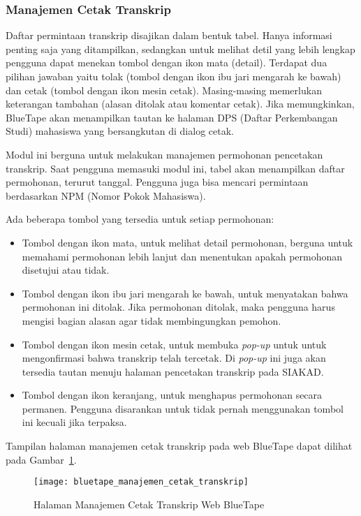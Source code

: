 \subsubsection{Manajemen Cetak Transkrip}
\label{sec:bluetape_manajemen_cetak_transkrip}
Daftar permintaan transkrip disajikan dalam bentuk tabel. Hanya informasi penting saja yang ditampilkan, sedangkan untuk melihat detil yang lebih lengkap pengguna dapat menekan tombol dengan ikon mata (detail). Terdapat dua pilihan jawaban yaitu tolak (tombol dengan ikon ibu jari mengarah ke bawah) dan cetak (tombol dengan ikon mesin cetak). Masing-masing memerlukan keterangan tambahan (alasan ditolak atau komentar cetak). Jika memungkinkan, BlueTape akan menampilkan tautan ke halaman DPS (Daftar Perkembangan Studi) mahasiswa yang bersangkutan di dialog cetak.

Modul ini berguna untuk melakukan manajemen permohonan pencetakan transkrip. Saat pengguna memasuki modul ini, tabel akan menampilkan daftar permohonan, terurut tanggal. Pengguna juga bisa mencari permintaan berdasarkan NPM (Nomor Pokok Mahasiswa).

Ada beberapa tombol yang tersedia untuk setiap permohonan:
\begin{itemize}
	\item Tombol dengan ikon mata, untuk melihat detail permohonan, berguna untuk memahami permohonan lebih lanjut dan menentukan apakah permohonan disetujui atau tidak.
	\item Tombol dengan ikon ibu jari mengarah ke bawah, untuk menyatakan bahwa permohonan ini ditolak. Jika permohonan ditolak, maka pengguna harus mengisi bagian alasan agar tidak membingungkan pemohon.
	\item Tombol dengan ikon mesin cetak, untuk membuka \textit{pop-up} untuk untuk mengonfirmasi bahwa transkrip telah tercetak. Di \textit{pop-up} ini juga akan tersedia tautan menuju halaman pencetakan transkrip pada SIAKAD.
	\item Tombol dengan ikon keranjang, untuk menghapus permohonan secara permanen. Pengguna disarankan untuk tidak pernah menggunakan tombol ini kecuali jika terpaksa.
\end{itemize} 

Tampilan halaman manajemen cetak transkrip pada web BlueTape dapat dilihat pada \mbox{Gambar \ref{fig:bluetape_manajemen_cetak_transkrip}}.

\begin{figure}[H]
    \centering  
    \texttt{[image: bluetape\_manajemen\_cetak\_transkrip]}
    \caption[Halaman Manajemen Cetak Transkrip Web BlueTape]{Halaman Manajemen Cetak Transkrip Web BlueTape}
    \label{fig:bluetape_manajemen_cetak_transkrip}
\end{figure}